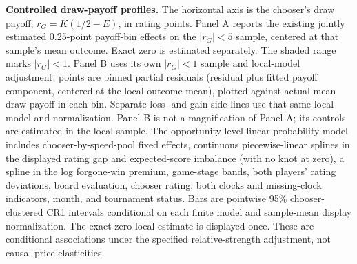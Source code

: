 \caption{\textbf{Controlled draw-payoff profiles.}
The horizontal axis is the chooser's draw payoff, $r_G=K(1/2-E)$, in rating
points. Panel A reports the existing jointly estimated 0.25-point payoff-bin
effects on the $|r_G|<5$ sample, centered at that sample's mean outcome.
Exact zero is estimated separately. The shaded range marks $|r_G|<1$.
Panel B uses its own $|r_G|<1$ sample and local-model adjustment: points are
binned partial residuals (residual plus fitted payoff component, centered at
the local outcome mean), plotted against actual mean draw payoff in each bin.
Separate loss- and gain-side lines use that same local model and normalization.
Panel B is not a magnification of Panel A; its controls are estimated in the
local sample. The opportunity-level linear probability model includes chooser-by-speed-pool
fixed effects, continuous piecewise-linear splines in the displayed rating gap
and expected-score imbalance (with no knot at zero), a spline in the log
forgone-win premium, game-stage bands, both players' rating deviations, board
evaluation, chooser rating, both clocks and missing-clock indicators, month,
and tournament status.
Bars are pointwise 95\% chooser-clustered CR1 intervals conditional on each
finite model and sample-mean display normalization. The exact-zero local
estimate is displayed once. These are conditional associations under the
specified relative-strength adjustment, not causal price elasticities.}
